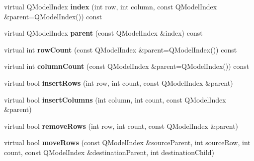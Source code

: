 \begin{DoxyCompactItemize}
\item 
\mbox{\label{class_extendable_item_model_af8ec9ce6a15ba7bfb11bf0162dd44c0c}} 
virtual Q\+Model\+Index {\bfseries index} (int row, int column, const Q\+Model\+Index \&parent=Q\+Model\+Index()) const
\item 
\mbox{\label{class_extendable_item_model_a8fa3d6ed261d2d811740a266e5bf3d85}} 
virtual Q\+Model\+Index {\bfseries parent} (const Q\+Model\+Index \&index) const
\item 
\mbox{\label{class_extendable_item_model_a1f111148c43b7945ec13b31e1fd68602}} 
virtual int {\bfseries row\+Count} (const Q\+Model\+Index \&parent=Q\+Model\+Index()) const
\item 
\mbox{\label{class_extendable_item_model_a60bf085a67ace60208056f35af403965}} 
virtual int {\bfseries column\+Count} (const Q\+Model\+Index \&parent=Q\+Model\+Index()) const
\item 
\mbox{\label{class_extendable_item_model_a1ce2fcafb7dea41b0d922b7172d23e0d}} 
virtual bool {\bfseries insert\+Rows} (int row, int count, const Q\+Model\+Index \&parent)
\item 
\mbox{\label{class_extendable_item_model_abd1e1a5e8d942216dd9cfeaab5564eda}} 
virtual bool {\bfseries insert\+Columns} (int column, int count, const Q\+Model\+Index \&parent)
\item 
\mbox{\label{class_extendable_item_model_a0845398488e6f714ca6eda0670a7aa8e}} 
virtual bool {\bfseries remove\+Rows} (int row, int count, const Q\+Model\+Index \&parent)
\item 
\mbox{\label{class_extendable_item_model_a7d00afeac188e21c0d165b14a3c421cd}} 
virtual bool {\bfseries move\+Rows} (const Q\+Model\+Index \&source\+Parent, int source\+Row, int count, const Q\+Model\+Index \&destination\+Parent, int destination\+Child)
\item 
\mbox{\label{class_extendable_item_model_a72c65abf36fbe31778e73c983da260cc}} 

\end{DoxyCompactItemize}
